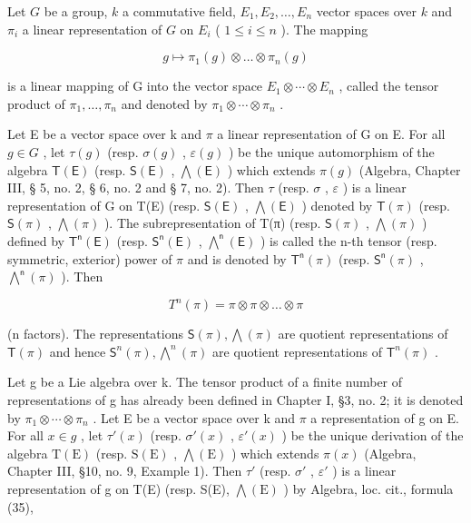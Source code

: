 

Let \(G\) be a group, \(k\) a commutative field, \(E_1, E_2, \ldots, E_n\) vector spaces over \(k\) and \(\pi_i\) a linear representation of \(G\) on \(E_i\) ( \(1 \leqslant i \leqslant n\) ). The mapping

\[
g \mapsto \pi_ {1} (g) \otimes \dots \otimes \pi_ {n} (g)
\]

is a linear mapping of G into the vector space \(E_{1} \otimes \cdots \otimes E_{n}\) , called the tensor product of \(\pi_{1}, \ldots, \pi_{n}\) and denoted by \(\pi_{1} \otimes \cdots \otimes \pi_{n}\) .

Let E be a vector space over k and \(\pi\) a linear representation of G on E. For all \(g \in G\) , let \(\tau(g)\) (resp. \(\sigma(g)\) , \(\varepsilon(g)\) ) be the unique automorphism of the algebra \(\mathsf{T}(\mathsf{E})\) (resp. \(\mathsf{S}(\mathsf{E})\) , \(\bigwedge(\mathsf{E})\) ) which extends \(\pi(g)\) (Algebra, Chapter III, § 5, no. 2, § 6, no. 2 and § 7, no. 2). Then \(\tau\) (resp. \(\sigma\) , \(\varepsilon\) ) is a linear representation of G on T(E) (resp. \(\mathsf{S}(\mathsf{E})\) , \(\bigwedge(\mathsf{E})\) ) denoted by \(\mathsf{T}(\pi)\) (resp. \(\mathsf{S}(\pi)\) , \(\bigwedge(\pi)\) ). The subrepresentation of T(π) (resp. \(\mathsf{S}(\pi)\) , \(\bigwedge(\pi)\) ) defined by \(\mathsf{T}^{\mathsf{n}}(\mathsf{E})\) (resp. \(\mathsf{S}^{\mathsf{n}}(\mathsf{E})\) , \(\bigwedge^{\mathsf{n}}(\mathsf{E})\) ) is called the n-th tensor (resp. symmetric, exterior) power of \(\pi\) and is denoted by \(\mathsf{T}^{\mathsf{n}}(\pi)\) (resp. \(\mathsf{S}^{\mathsf{n}}(\pi)\) , \(\bigwedge^{\mathsf{n}}(\pi)\) ). Then

\[
T ^ {n} (\pi) = \pi \otimes \pi \otimes \dots \otimes \pi
\]

(n factors). The representations \(\mathsf{S}(\pi), \bigwedge (\pi)\) are quotient representations of \(\mathsf{T}(\pi)\) and hence \(\mathsf{S}^n (\pi), \bigwedge^n (\pi)\) are quotient representations of \(\mathsf{T}^n (\pi)\) .

Let g be a Lie algebra over k. The tensor product of a finite number of representations of g has already been defined in Chapter I, §3, no. 2; it is denoted by \(\pi_{1}\otimes\cdots\otimes\pi_{n}\) . Let E be a vector space over k and \(\pi\) a representation of g on E. For all \(x\in g\) , let \(\tau'(x)\) (resp. \(\sigma'(x)\) , \(\varepsilon'(x)\) ) be the unique derivation of the algebra \(\mathrm{T(E)}\) (resp. \(\mathrm{S(E)}\) , \(\bigwedge(\mathrm{E})\) ) which extends \(\pi(x)\) (Algebra, Chapter III, §10, no. 9, Example 1). Then \(\tau'\) (resp. \(\sigma'\) , \(\varepsilon'\) ) is a linear representation of g on T(E) (resp. S(E), \(\bigwedge(\mathrm{E})\) ) by Algebra, loc. cit., formula (35),

